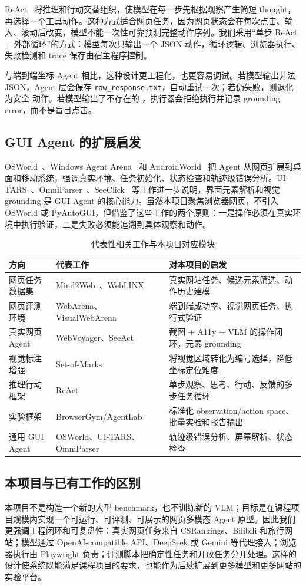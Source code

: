 ReAct~\cite{react} 将推理和行动交替组织，使模型在每一步先根据观察产生简短 thought，再选择一个工具动作。这种方式适合网页任务，因为网页状态会在每次点击、输入、滚动后改变，模型不能一次性可靠预测完整动作序列。我们采用“单步 ReAct + 外部循环”的方式：模型每次只输出一个 JSON 动作，循环逻辑、浏览器执行、失败检测和 trace 保存由宿主程序控制。

与端到端坐标 Agent 相比，这种设计更工程化，也更容易调试。若模型输出非法 JSON，Agent 层会保存 \texttt{raw\_response.txt}，自动重试一次；若仍失败，则退化为安全  动作。若模型输出了不存在的 ，执行器会拒绝执行并记录 grounding error，而不是盲目点击。

\subsection{GUI Agent 的扩展启发}

OSWorld~\cite{osworld}、Windows Agent Arena~\cite{windowsarena} 和 AndroidWorld~\cite{androidworld} 把 Agent 从网页扩展到桌面和移动系统，强调真实环境、任务初始化、状态检查和轨迹级错误分析。UI-TARS~\cite{uitars}、OmniParser~\cite{omniparser}、SeeClick~\cite{seeclick} 等工作进一步说明，界面元素解析和视觉 grounding 是 GUI Agent 的核心能力。虽然本项目聚焦浏览器网页，不引入 OSWorld 或 PyAutoGUI，但借鉴了这些工作的两个原则：一是操作必须在真实环境中执行验证，二是失败必须能追溯到具体观察和动作。

\begin{table}[H]
  \centering
  \caption{代表性相关工作与本项目对应模块}
  \label{tab:related-work}
  \small
  \begin{tabularx}{\textwidth}{p{}p{}Y}
    \toprule
    方向 & 代表工作 & 对本项目的启发 \\
    \midrule
    网页任务数据集 & Mind2Web~\cite{mind2web}、WebLINX~\cite{weblinx} & 真实网站任务、候选元素筛选、动作历史建模 \\
    网页评测环境 & WebArena、VisualWebArena & 端到端成功率、视觉网页任务、执行式验证 \\
    真实网页 Agent & WebVoyager、SeeAct & 截图 + A11y + VLM 的操作闭环，元素 grounding \\
    视觉标注增强 & Set-of-Marks & 将视觉区域转化为编号选择，降低坐标定位难度 \\
    推理行动框架 & ReAct & 单步观察、思考、行动、反馈的多步任务循环 \\
    实验框架 & BrowserGym/AgentLab & 标准化 observation/action space、批量实验和报告输出 \\
    通用 GUI Agent & OSWorld、UI-TARS、OmniParser & 轨迹级错误分析、屏幕解析、状态检查 \\
    \bottomrule
  \end{tabularx}
\end{table}

\subsection{本项目与已有工作的区别}

本项目不是构造一个新的大型 benchmark，也不训练新的 VLM；目标是在课程项目规模内实现一个可运行、可评测、可展示的网页多模态 Agent 原型。因此我们更强调工程闭环和可复盘性：真实网页任务来自 CSRankings、Bilibili 和旅行网站；模型通过 OpenAI-compatible API、DeepSeek 或 Gemini 等代理接入；浏览器执行由 Playwright 负责；评测脚本把确定性任务和开放任务分开处理。这样的设计使系统既能满足课程项目的要求，也能作为后续扩展到更多模型和更多网站的实验平台。
